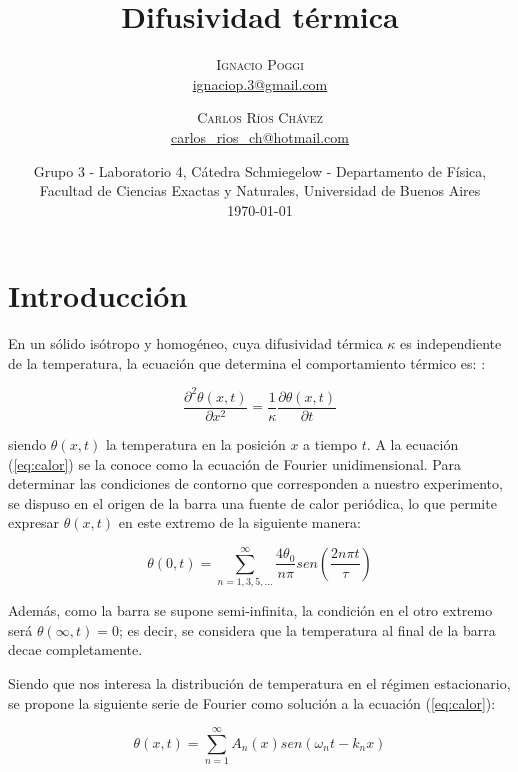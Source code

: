 \documentclass[twoside,twocolumn,a4paper]{article}
\title{Difusividad t\'ermica} %
\author{%
\textsc{Ignacio Poggi} \\[1ex] %
\normalsize \href{mailto:ignaciop.3@gmail.com}{ignaciop.3@gmail.com} %
\and %
\textsc{Carlos R\'ios Ch\'avez} \\[1ex] %
\normalsize \href{mailto:carlos_rios_ch@hotmail.com}{carlos\_rios\_ch@hotmail.com} %
}
\date{Grupo 3 - Laboratorio 4, C\'atedra Schmiegelow - Departamento de F\'isica, Facultad de Ciencias Exactas y Naturales, Universidad de Buenos Aires \newline \\ \today} %
\begin{document}
\maketitle



\section{Introducci\'on}

En un s\'olido is\'otropo y homog\'eneo, cuya difusividad t\'ermica $\kappa$ es independiente de la temperatura, la ecuaci\'on que determina el comportamiento t\'ermico es: \cite{eq:calor}:

\begin{equation}
\label{eq:calor}
\frac{\partial^2 \theta (x,t)}{\partial x^{2}} = \frac{1}{\kappa} \frac{\partial \theta (x,t)}{\partial t}
\end{equation}

siendo $\theta(x,t)$ la temperatura en la posici\'on $x$ a tiempo $t$. A la ecuaci\'on (\ref{eq:calor}) se la conoce como la ecuaci\'on de Fourier unidimensional. Para determinar las condiciones de contorno que corresponden a nuestro experimento, se dispuso en el origen de la barra una fuente de calor peri\'odica, lo que permite expresar $\theta(x,t)$ en este extremo de la siguiente manera:

\begin{equation}
\label{eq:theta0}
\theta(0,t) = \sum_{n = 1, 3, 5, ...}^{\infty} \frac{4\theta_{0}}{n\pi} sen(\frac{2n\pi t}{\tau})
\end{equation}

Adem\'as, como la barra se supone semi-infinita, la condici\'on en el otro extremo ser\'a $\theta(\infty,t) = 0$; es decir, se considera que la temperatura al final de la barra decae completamente. \newline

\par
Siendo que nos interesa la distribuci\'on de temperatura en el r\'egimen estacionario, se propone la siguiente serie de Fourier como soluci\'on a la ecuaci\'on (\ref{eq:calor}):

\begin{equation}
\label{eq:solgeneral}
\theta(x,t) = \sum_{n = 1}^{\infty} A_{n}(x) sen(\omega_{n}t - k_{n}x)
\end{equation}
\end{document}
